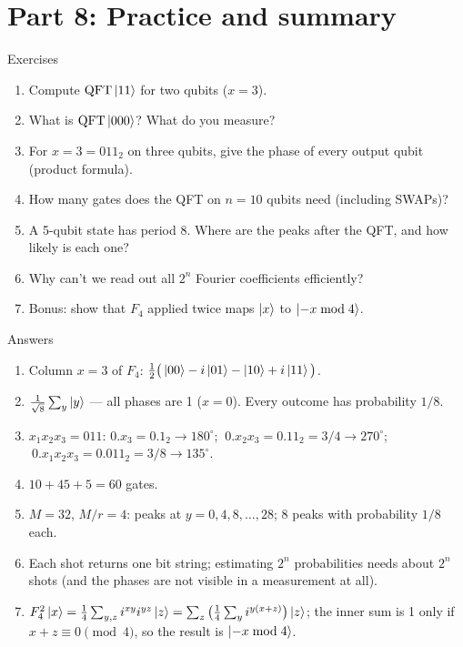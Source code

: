 \documentclass[aspectratio=169,11pt]{beamer}
\begin{document}
\section{Part 8: Practice and summary}
\begin{frame}{Exercises}
  \begin{enumerate}
    \item Compute $\mathrm{QFT}\ket{11}$ for two qubits ($x = 3$).
    \item What is $\mathrm{QFT}\ket{000}$? What do you measure?
    \item For $x = 3 = 011_2$ on three qubits, give the phase of every output qubit (product formula).
    \item How many gates does the QFT on $n = 10$ qubits need (including SWAPs)?
    \item A 5-qubit state has period 8. Where are the peaks after the QFT, and how likely is each one?
    \item Why can't we read out all $2^n$ Fourier coefficients efficiently?
    \item Bonus: show that $F_4$ applied twice maps $\ket{x}$ to $\ket{-x \bmod 4}$.
  \end{enumerate}
\end{frame}

\begin{frame}{Answers}
  \small
  \begin{enumerate}
    \item Column $x = 3$ of $F_4$: $\tfrac12\big(\ket{00} - i\ket{01} - \ket{10} + i\ket{11}\big)$.
    \item $\tfrac{1}{\sqrt8}\sum_y\ket y$ --- all phases are 1 ($x = 0$). Every outcome has probability $1/8$.
    \item $x_1x_2x_3 = 011$: $0.x_3 = 0.1_2 \to 180^\circ$; $\ 0.x_2x_3 = 0.11_2 = 3/4 \to 270^\circ$;
      $\ 0.x_1x_2x_3 = 0.011_2 = 3/8 \to 135^\circ$.
    \item $10 + 45 + 5 = 60$ gates.
    \item $M = 32$, $M/r = 4$: peaks at $y = 0, 4, 8, \dots, 28$; 8 peaks with probability $1/8$ each.
    \item Each shot returns one bit string; estimating $2^n$ probabilities needs about $2^n$ shots (and the phases are
      not visible in a measurement at all).
    \item $F_4^2\ket x = \tfrac14\sum_{y,z} i^{xy} i^{yz}\ket z = \sum_z\big(\tfrac14\sum_y i^{y(x+z)}\big)\ket z$; the
      inner sum is 1 only if $x + z \equiv 0 \pmod 4$, so the result is $\ket{-x \bmod 4}$.
  \end{enumerate}
\end{frame}
\end{document}
